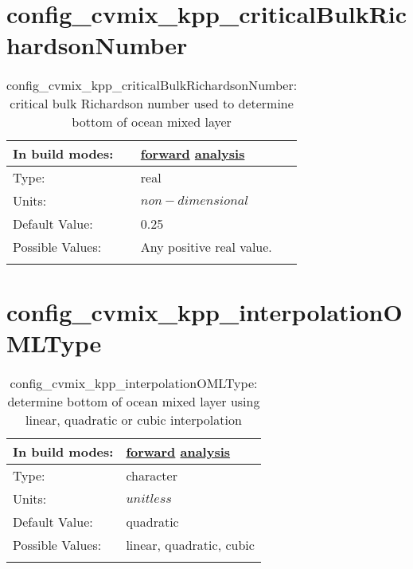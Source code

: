 \section[config\_cvmix\_kpp\_criticalBulkRichardsonNumber]{config\_cvmix\_kpp\_criticalBulkRichardsonNumber}
\label{sec:nm_sec_config_cvmix_kpp_criticalBulkRichardsonNumber}
\begin{center}
\begin{longtable}{| p{2.0in} || p{4.0in} |}
    \hline
    In build modes: & \hyperref[subsec:forward_nm_tab_cvmix]{forward} \hyperref[subsec:analysis_nm_tab_cvmix]{analysis} \\
    \hline
    Type: & real \\
    \hline
    Units: & $non-dimensional$ \\
    \hline
    Default Value: & 0.25 \\
    \hline
    Possible Values: & Any positive real value. \\
    \hline
    \caption{config\_cvmix\_kpp\_criticalBulkRichardsonNumber: critical bulk Richardson number used to determine bottom of ocean mixed layer}
\end{longtable}
\end{center}
\section[config\_cvmix\_kpp\_interpolationOMLType]{config\_cvmix\_kpp\_interpolationOMLType}
\label{sec:nm_sec_config_cvmix_kpp_interpolationOMLType}
\begin{center}
\begin{longtable}{| p{2.0in} || p{4.0in} |}
    \hline
    In build modes: & \hyperref[subsec:forward_nm_tab_cvmix]{forward} \hyperref[subsec:analysis_nm_tab_cvmix]{analysis} \\
    \hline
    Type: & character \\
    \hline
    Units: & $unitless$ \\
    \hline
    Default Value: & quadratic \\
    \hline
    Possible Values: & linear, quadratic, cubic \\
    \hline
    \caption{config\_cvmix\_kpp\_interpolationOMLType: determine bottom of ocean mixed layer using linear, quadratic or cubic interpolation}
\end{longtable}
\end{center}
